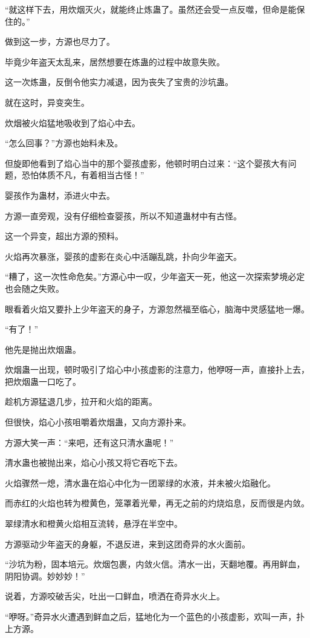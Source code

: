 \begin{this_body}
“就这样下去，用炊烟灭火，就能终止炼蛊了。虽然还会受一点反噬，但命是能保住的。”

做到这一步，方源也尽力了。

毕竟少年盗天太乱来，居然想要在炼蛊的过程中故意失败。

这一次炼蛊，反倒令他实力减退，因为丧失了宝贵的沙坑蛊。

就在这时，异变突生。

炊烟被火焰猛地吸收到了焰心中去。

“怎么回事？”方源也始料未及。

但旋即他看到了焰心当中的那个婴孩虚影，他顿时明白过来：“这个婴孩大有问题，恐怕体质不凡，有着相当古怪！”

婴孩作为蛊材，添进火中去。

方源一直旁观，没有仔细检查婴孩，所以不知道蛊材中有古怪。

这一个异变，超出方源的预料。

火焰再次暴涨，婴孩的虚影在炎心中活蹦乱跳，扑向少年盗天。

“糟了，这一次性命危矣。”方源心中一叹，少年盗天一死，他这一次探索梦境必定也会随之失败。

眼看着火焰又要扑上少年盗天的身子，方源忽然福至临心，脑海中灵感猛地一爆。

“有了！”

他先是抛出炊烟蛊。

炊烟蛊一出现，顿时吸引了焰心中小孩虚影的注意力，他咿呀一声，直接扑上去，把炊烟蛊一口吃了。

趁机方源猛退几步，拉开和火焰的距离。

但很快，焰心小孩咀嚼着炊烟蛊，又向方源扑来。

方源大笑一声：“来吧，还有这只清水蛊呢！”

清水蛊也被抛出来，焰心小孩又将它吞吃下去。

火焰骤然一熄，清水蛊在焰心中化为一团翠绿的水液，并未被火焰融化。

而赤红的火焰也转为橙黄色，笼罩着光晕，再无之前的灼烧焰息，反而很是内敛。

翠绿清水和橙黄火焰相互流转，悬浮在半空中。

方源驱动少年盗天的身躯，不退反进，来到这团奇异的水火面前。

“沙坑为粉，固本培元。炊烟包裹，内敛火信。清水一出，天翻地覆。再用鲜血，阴阳协调。妙妙妙！”

说着，方源咬破舌尖，吐出一口鲜血，喷洒在奇异水火上。

“咿呀。”奇异水火遭遇到鲜血之后，猛地化为一个蓝色的小孩虚影，欢叫一声，扑上方源。


\end{this_body}
